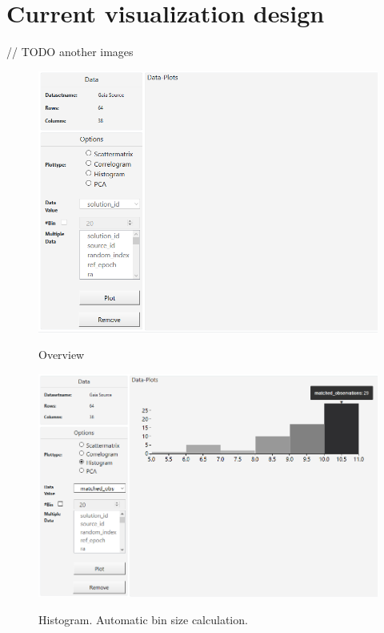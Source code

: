\documentclass{article}
\begin{document}
\section{Current visualization design}
// TODO another images
\newpage
\begin{figure}[!h]
\centering
\includegraphics[width=1\textwidth]{images/m3/uebersicht.PNG}
\label{fig1}
\caption{Overview}
\end{figure} 
\newpage
\begin{figure}[!h]
\centering
\includegraphics[width=1\textwidth]{images/m3/histogram1.PNG}
\label{fig2}
\caption{Histogram. Automatic bin size calculation.}
\end{figure}
\newpage
\end{document}
